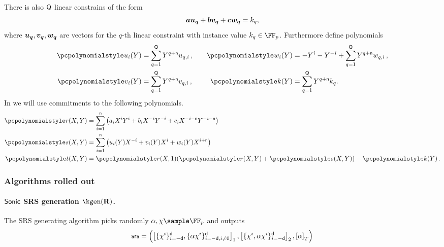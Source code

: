 \documentclass[runningheads,10pt]{llncs}
\let\spvec\vec
\let\vec\accentvec
\let\spvec\vec
\let\vec\spvec
\def\vec#1{\mathchoice{\mbox{\boldmath$\displaystyle#1$}}
  {\mbox{\boldmath$\textstyle#1$}} {\mbox{\boldmath$\scriptstyle#1$}}
  {\mbox{\boldmath$\scriptscriptstyle#1$}}}
\begin{document}
There is also $\mathsf{Q}$ linear constrains of the form
\[
  \va \vec{u_q} + \vb \vec{v_q} + \vc \vec{w_q} = k_q,
\]
where $\vec{u_q}, \vec{v_q}, \vec{w_q}$ are vectors for the $q$-th linear
constraint with instance value $k_q \in \FF_p$. Furthermore define polynomials
\begin{equation}
  \begin{split}
    \p{u_i}(Y) & = \sum_{q = 1}^\linconstr Y^{q + \multconstr} u_{q, i}\,,\\
    \p{v_i}(Y) & = \sum_{q = 1}^\linconstr Y^{q + \multconstr} v_{q, i}\,,\\
  \end{split}
  \qquad
  \begin{split}
    \p{w_i}(Y) & = -Y^i - Y^{-i} + \sum_{q = 1}^\linconstr Y^{q +
      \multconstr} w_{q, i}\,,\\
    \p{k}(Y) & = \sum_{q = 1}^\linconstr Y^{q + \multconstr} k_{q}.
  \end{split}
\end{equation}
In \sonic{} we will use commitments to the following polynomials.
\begin{align*}
  \pr(X, Y) & = \sum_{i = 1}^{\multconstr} \left(a_i X^i Y^i + b_i X^{-i} Y^{-i}
              + c_i X^{-i - \multconstr} Y^{-i - \multconstr}\right) \\
  \p{s}(X, Y) & = \sum_{i = 1}^{\multconstr} \left( u_i (Y) X^{-i} +
                v_i(Y) X^i + w_i(Y) X^{i + \multconstr}\right)\\
  \pt(X, Y) & = \pr(X, 1) (\pr(X, Y) + \p{s}(X, Y)) - \p{k}(Y)\,.
\end{align*}
	
\subsubsection{Algorithms rolled out}
\paragraph{${\textnormal{\textsf{Sonic}}}$ SRS generation $\kgen(\REL)$.} The SRS generating algorithm picks
randomly $\alpha, \chi \sample \FF_p$ and outputs
	\[
      \mathsf{srs} = \left( \left[\{\chi^i\}_{i = -\mathsf{d}}^{\mathsf{d}},
          \{\alpha \chi^i\}_{i = -\mathsf{d}, i \neq 0}^{\mathsf{d}}\right]_{1},
        \left[\{\chi^i, \alpha \chi^i\}_{i = - \mathsf{d}}^{\mathsf{d}}\right]_{2},
        \left[\alpha\right]_{T} \right)
	\]
\end{document}
